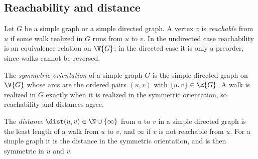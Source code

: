 %
\subsection{Reachability and distance}

\begin{definition}[Reachability]
  \label{def:reachable-directed}
  \leanok
  Let $G$ be a simple graph or a simple directed graph. A vertex $v$ is \emph{reachable}
  from $u$ if some walk realized in $G$ runs from $u$ to $v$. In the undirected case
  reachability is an equivalence relation on $\V{G}$; in the directed case it is only a
  preorder, since walks cannot be reversed.
\end{definition}

\begin{definition}
  \label{def:symmetric-orientation}
  \leanok
  The \emph{symmetric orientation} of a simple graph $G$ is the simple directed graph on
  $\V{G}$ whose arcs are the ordered pairs $(u, v)$ with $\{u, v\} \in \E{G}$. A walk is
  realized in $G$ exactly when it is realized in the symmetric orientation, so
  reachability and distances agree.
\end{definition}

\begin{definition}[Distance]
  \label{def:dist}
  \leanok
  The \emph{distance} $\dist(u, v) \in \N \cup \{\infty\}$ from $u$ to $v$ in a simple
  directed graph is the least length of a walk from $u$ to $v$, and $\infty$ if $v$ is not
  reachable from $u$. For a simple graph it is the distance in the symmetric orientation,
  and is then symmetric in $u$ and $v$.
\end{definition}
